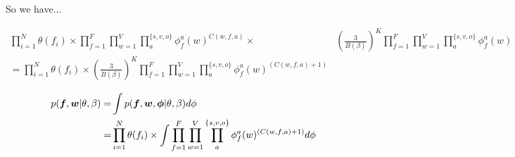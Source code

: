 \documentclass{article}
\begin{document}
So we have...

\begin{align*}
\prod_{i=1}^{N}\theta(f_i) \times
\prod_{f=1}^{F}\prod_{w=1}^{V}\prod_{a}^{\{s,v,o\}}\phi_f^a(w)^{C(w,f,a)} \times
& (\frac{3}{B(\beta)})^K\prod_{f=1}^{F}\prod_{w=1}^{V}\prod_{a}^{\{s,v,o\}}\phi_f^a(w)\\
= \prod_{i=1}^{N}\theta(f_i) \times
(\frac{3}{B(\beta)})^K
\prod_{f=1}^{F}\prod_{w=1}^{V}\prod_{a}^{\{s,v,o\}}\phi_f^a(w)^{(C(w,f,a) + 1)}
\end{align*}

\begin{align*}
p(\boldsymbol{f},\boldsymbol{w}|\theta,\beta) =& \int p(\boldsymbol{f},\boldsymbol{w},\boldsymbol{\phi}|\theta,\beta) d\phi\\
=& 
\prod_{i=1}^{N}\theta(f_i) \times
\int\prod_{f=1}^{F}\prod_{w=1}^{V}\prod_{a}^{\{s,v,o\}}\phi_f^a(w)^{(C(w,f,a) + 1)}d\phi
\end{align*}
\end{document}
